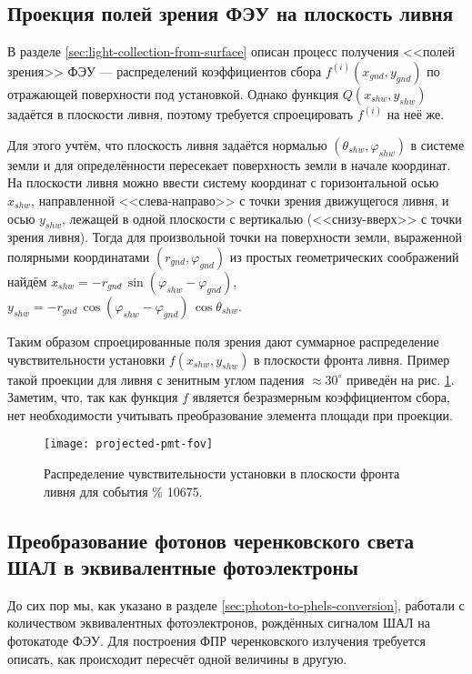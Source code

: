 \subsection{Проекция полей зрения ФЭУ на плоскость ливня}

В разделе \ref{sec:light-collection-from-surface} описан процесс получения <<полей зрения>> ФЭУ --- распределений коэффициентов сбора $f^{(i)}(x_{gnd}, y_{gnd})$ по отражающей поверхности под установкой. Однако функция $Q(x_{shw}, y_{shw})$ задаётся в плоскости ливня, поэтому требуется спроецировать $f^{(i)}$ на неё же.

Для этого учтём, что плоскость ливня задаётся нормалью $(\theta_{shw}, \varphi_{shw})$ в системе земли и для определённости пересекает поверхность земли в начале координат. На плоскости ливня можно ввести систему координат с горизонтальной осью $x_{shw}$, направленной <<слева-направо>> с точки зрения движущегося ливня, и осью $y_{shw}$, лежащей в одной плоскости с вертикалью (<<снизу-вверх>> с точки зрения ливня). Тогда для произвольной точки на поверхности земли, выраженной полярными координатами $(r_{gnd}, \varphi_{gnd})$ из простых геометрических соображений найдём $x_{shw} = - r_{gnd} \, \sin (\varphi_{shw} - \varphi_{gnd})$, $y_{shw} = - r_{gnd} \, \cos (\varphi_{shw} - \varphi_{gnd}) \, \cos \theta_{shw}$.

Таким образом спроецированные поля зрения дают суммарное распределение чувствительности установки $f(x_{shw}, y_{shw})$ в плоскости фронта ливня. Пример такой проекции для ливня с зенитным углом падения $\approx 30^{\circ}$ приведён на рис. \ref{pic:projected-pmt-fov}. Заметим, что, так как функция $f$ является безразмерным коэффициентом сбора, нет необходимости учитывать преобразование элемента площади при проекции.

\begin{figure}
	\centering
	\texttt{[image: projected-pmt-fov]}
	\caption{Распределение чувствительности установки в плоскости фронта ливня для события \% 10675.}
	\label{pic:projected-pmt-fov}
\end{figure}

\subsection{Преобразование фотонов черенковского света ШАЛ в эквивалентные фотоэлектроны}

До сих пор мы, как указано в разделе \ref{sec:photon-to-phels-conversion}, работали с количеством эквивалентных фотоэлектронов, рождённых сигналом ШАЛ на фотокатоде ФЭУ. Для построения ФПР черенковского излучения требуется описать, как происходит пересчёт одной величины в другую.

